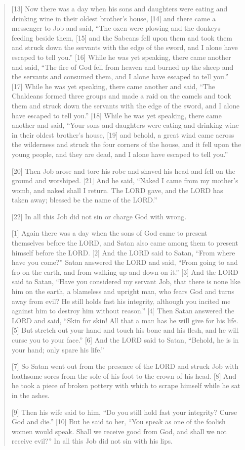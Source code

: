 \begin{quote}
    [13] Now there was a day when his sons and daughters were eating and drinking wine in their oldest brother’s house, [14] and there came a messenger to Job and said, “The oxen were plowing and the donkeys feeding beside them, [15] and the Sabeans fell upon them and took them and struck down the servants with the edge of the sword, and I alone have escaped to tell you.” [16] While he was yet speaking, there came another and said, “The fire of God fell from heaven and burned up the sheep and the servants and consumed them, and I alone have escaped to tell you.” [17] While he was yet speaking, there came another and said, “The Chaldeans formed three groups and made a raid on the camels and took them and struck down the servants with the edge of the sword, and I alone have escaped to tell you.” [18] While he was yet speaking, there came another and said, “Your sons and daughters were eating and drinking wine in their oldest brother’s house, [19] and behold, a great wind came across the wilderness and struck the four corners of the house, and it fell upon the young people, and they are dead, and I alone have escaped to tell you.”

    [20] Then Job arose and tore his robe and shaved his head and fell on the ground and worshiped. [21] And he said, “Naked I came from my mother’s womb, and naked shall I return. The LORD gave, and the LORD has taken away; blessed be the name of the LORD.”

    [22] In all this Job did not sin or charge God with wrong.

    [1] Again there was a day when the sons of God came to present themselves before the LORD, and Satan also came among them to present himself before the LORD. [2] And the LORD said to Satan, “From where have you come?” Satan answered the LORD and said, “From going to and fro on the earth, and from walking up and down on it.” [3] And the LORD said to Satan, “Have you considered my servant Job, that there is none like him on the earth, a blameless and upright man, who fears God and turns away from evil? He still holds fast his integrity, although you incited me against him to destroy him without reason.” [4] Then Satan answered the LORD and said, “Skin for skin! All that a man has he will give for his life. [5] But stretch out your hand and touch his bone and his flesh, and he will curse you to your face.” [6] And the LORD said to Satan, “Behold, he is in your hand; only spare his life.”

    [7] So Satan went out from the presence of the LORD and struck Job with loathsome sores from the sole of his foot to the crown of his head. [8] And he took a piece of broken pottery with which to scrape himself while he sat in the ashes.

    [9] Then his wife said to him, “Do you still hold fast your integrity? Curse God and die.” [10] But he said to her, “You speak as one of the foolish women would speak. Shall we receive good from God, and shall we not receive evil?” In all this Job did not sin with his lips.
  \end{quote}
